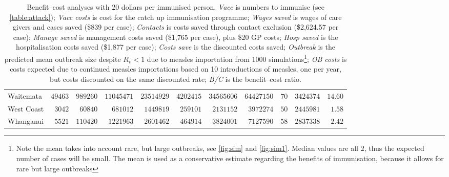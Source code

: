 \documentclass{article}
\begin{document}
\begin{table}
\begin{center}
\begin{tabular}{lrrrrrrrrrr}
Waitemata&$49463$&$989260$&$11045471$&$23514929$&$4202415$&$34565606$&$64427150$&$ 70$&$3424374$&$14.60$\tabularnewline
West Coast&$ 3042$&$ 60840$&$  681012$&$ 1449819$&$ 259101$&$ 2131152$&$ 3972274$&$ 50$&$2445981$&$ 1.58$\tabularnewline
Whanganui&$ 5521$&$110420$&$ 1221963$&$ 2601462$&$ 464914$&$ 3824001$&$ 7127590$&$ 58$&$2837338$&$ 2.42$\tabularnewline
\hline
\end{tabular}\end{center}\caption{Benefit--cost analyses with 20 dollars per immunised person. \textit{Vacc} is numbers to immunise (see \autoref{table:attack}); \textit{Vacc costs} is cost for the catch up immunisation programme; \textit{Wages saved} is wages of care givers and cases saved (\$839 per case); \textit{Contacts} is costs saved through contact exclusion (\$2,624.57 per case); \textit{Manage saved} is management costs saved (\$1,765 per case), plus \$20 GP costs; \textit{Hosp saved} is the hospitalisation costs saved (\$1,877 per case); \textit{Costs save}  is the discounted costs saved; \textit{Outbreak}	is the predicted mean outbreak size despite $R_v < 1$ due to measles importation from 1000 simulations\footnote{Note the mean takes into account rare, but large outbreaks, see \autoref{fig:sim} and \autoref{fig:sim1}. Median values are all 2, thus the expected number of cases will be small. The mean is used as a conservative estimate regarding the benefits of immunisation, because it allows for rare but large outbreaks}; \textit{OB costs}	is costs expected due to continued measles importations based on 10 introductions of measles, one per year, but costs discounted on the same discounted rate; \textit{B/C} is the benefit--cost ratio.}
\label{table:cost20}
\end{table}
\end{document}

